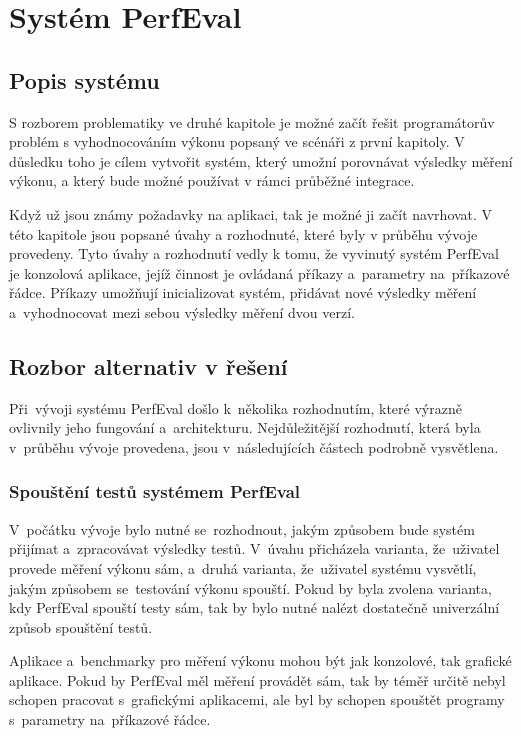 \chapter{Systém PerfEval}

\section{Popis systému}

S rozborem problematiky ve druhé kapitole je možné začít řešit programátorův
problém s vyhodnocováním výkonu popsaný ve scénáři z první kapitoly.
V důsledku toho je cílem vytvořit systém, který umožní porovnávat výsledky
měření výkonu, a který bude možné používat v rámci průběžné integrace.

Když už jsou známy požadavky na aplikaci, tak je možné ji začít navrhovat.
V této kapitole jsou popsané úvahy a rozhodnuté, které byly v průběhu vývoje
provedeny. Tyto úvahy a rozhodnutí vedly k tomu, že vyvinutý systém PerfEval je konzolová aplikace,
jejíž činnost je ovládaná příkazy a~parametry na~příkazové řádce.
Příkazy umožňují inicializovat systém, přidávat nové výsledky měření a~vyhodnocovat mezi sebou výsledky
měření dvou verzí.

\section{Rozbor alternativ v řešení}
Při~vývoji systému PerfEval došlo k~několika rozhodnutím, které výrazně ovlivnily jeho fungování a~architekturu.
Nejdůležitější rozhodnutí, která byla v~průběhu vývoje provedena, jsou v~následujících částech podrobně vysvětlena.

\subsection{Spouštění testů systémem PerfEval}
V~počátku vývoje bylo nutné se~rozhodnout, jakým způsobem bude systém přijímat a~zpracovávat výsledky testů.
V~úvahu přicházela varianta, že~uživatel provede měření výkonu sám, a~druhá varianta, že~uživatel systému
vysvětlí, jakým způsobem se~testování výkonu spouští. Pokud by byla zvolena varianta, kdy PerfEval spouští testy
sám, tak by bylo nutné nalézt dostatečně univerzální způsob spouštění testů.

Aplikace a~benchmarky pro měření výkonu mohou být jak konzolové, tak grafické aplikace. Pokud by PerfEval měl
měření provádět sám, tak by téměř určitě nebyl schopen pracovat s~grafickými aplikacemi, ale byl by schopen
spouštět programy s~parametry na~příkazové řádce.

